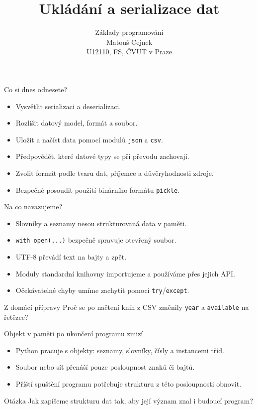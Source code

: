 \documentclass[aspectratio=169]{beamer}
\title{Ukládání a serializace dat}
\subtitle{Základy programování\\Matouš Cejnek\\U12110, FS, ČVUT v Praze}
\author{} \institute{} \date{}
\begin{document}
\begin{frame}
  \clearpage\thispagestyle{empty}\titlepage
\end{frame}

\begin{frame}{Co si dnes odnesete?}
  \begin{itemize}
    \item Vysvětlit serializaci a deserializaci.
    \item Rozlišit datový model, formát a soubor.
    \item Uložit a načíst data pomocí modulů \texttt{json} a \texttt{csv}.
    \item Předpovědět, které datové typy se při převodu zachovají.
    \item Zvolit formát podle tvaru dat, příjemce a důvěryhodnosti zdroje.
    \item Bezpečně posoudit použití binárního formátu \texttt{pickle}.
  \end{itemize}
\end{frame}

\begin{frame}{Na co navazujeme?}
  \begin{itemize}
    \item Slovníky a seznamy nesou strukturovaná data v paměti.
    \item \texttt{with open(...)} bezpečně spravuje otevřený soubor.
    \item UTF-8 převádí text na bajty a zpět.
    \item Moduly standardní knihovny importujeme a používáme přes jejich API.
    \item Očekávatelné chyby umíme zachytit pomocí \texttt{try}/\texttt{except}.
  \end{itemize}
  \begin{block}{Z domácí přípravy}
    Proč se po načtení knih z CSV změnily \texttt{year} a \texttt{available} na řetězce?
  \end{block}
\end{frame}

\begin{frame}{Objekt v paměti po ukončení programu zmizí}
  \begin{itemize}
    \item Python pracuje s objekty: seznamy, slovníky, čísly a instancemi tříd.
    \item Soubor nebo síť přenáší pouze posloupnost znaků či bajtů.
    \item Příští spuštění programu potřebuje strukturu z této posloupnosti obnovit.
  \end{itemize}
  \begin{block}{Otázka}
    Jak zapíšeme strukturu dat tak, aby její význam znal i budoucí program?
  \end{block}
\end{frame}
\end{document}
